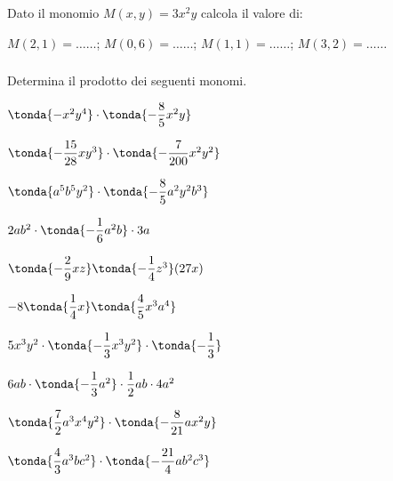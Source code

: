 \begin{esercizio}
\label{ese:9.12}
Dato il monomio \(M(x, y) = 3x^2y\) calcola il valore di:

\(M(2, 1) = \ldots\ldots\); \quad \(M(0, 6) = \ldots\ldots\); \quad 
\(M(1, 1) = \ldots\ldots\); \quad \(M(3, 2) = \ldots\ldots\) 
\end{esercizio}


\subsubsection*{}


\begin{esercizio}
\label{ese:9.13}
Determina il prodotto dei seguenti monomi.
\begin{htmulticols}{2}
\begin{enumeratea}
\spazielenx
\item \(\tonda{-x^{2}y^{4}}\cdot \tonda{-{\dfrac{8}{5}}x^{2}y}\)
\item 
\(\tonda{-{\dfrac{15}{28}}xy^{3}}\cdot\tonda{-\dfrac{7}{200}x^{2}y^{2}}\)
\item 
\(\tonda{a^{5}b^{5}y^{2}}\cdot\tonda{-\dfrac{8}{5}a^{2}y^{2}b^{3}}\)
\item \(2ab^{2}\cdot \tonda{-{\dfrac{1}{6}}a^{2}b}\cdot 3a\)
\item 
\(\tonda{-{\dfrac{2}{9}}xz}\tonda{-{\dfrac{1}{4}}z^{3}}(27x)\)
\item \(-8\tonda{\dfrac{1}{4}x}\tonda{\dfrac{4}{5}x^{3}a^{4}}\)
\item \(5x^{3}y^{2}\cdot \tonda{-{\dfrac{1}{3}}x^{3}y^{2}}\cdot 
\tonda{-{\dfrac{1}{3}}}\)
\item \(6ab\cdot \tonda{-{\dfrac{1}{3}}a^{2}}\cdot {\dfrac{1}{2}ab\cdot 
4a^{2}}\)
\item \(\tonda{\dfrac{7}{2}a^{3}x^{4}y^{2}}\cdot 
        \tonda{-{\dfrac{8}{21}}ax^{2}y}\)
\item \(\tonda{\dfrac{4}{3}a^{3}bc^{2}}\cdot 
        \tonda{-{\dfrac{21}{4}}ab^{2}c^3}\)
\end{enumeratea}
\end{htmulticols}
\end{esercizio}


